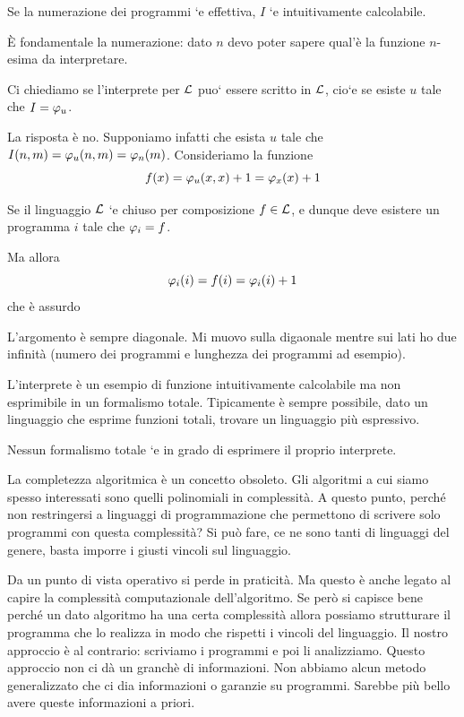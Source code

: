 Se la numerazione dei programmi `e effettiva, $I$ `e intuitivamente calcolabile.

È fondamentale la numerazione: dato $n$ devo poter sapere qual'è la funzione $n$-esima da interpretare.

Ci chiediamo se l'interprete per $\mathcal{L}$ puo` essere scritto in $\mathcal{L}$, cio`e se esiste $u$ tale
che $I = \varphi_{u}$.

La risposta è no. Supponiamo infatti che esista $u$ tale che $I(n, m) = \varphi_{u}(n, m) = \varphi_{n}(m)$.
Consideriamo la funzione
\begin{equation*}
    f(x) = \varphi_{u}(x,x) + 1 = \varphi_{x}(x)+1
\end{equation*}

Se il linguaggio $\mathcal{L}$ `e chiuso per composizione $f \in \mathcal{L}$, e dunque deve esistere un
programma $i$ tale che $\varphi_{i} = f$.

Ma allora
\begin{equation*}
    \varphi_{i}(i) = f(i) = \varphi_{i}(i) + 1
\end{equation*}
che è assurdo

L'argomento è sempre diagonale. Mi muovo sulla digaonale mentre sui lati ho due infinità (numero
dei programmi e lunghezza dei programmi ad esempio).

L'interprete è un esempio di funzione intuitivamente calcolabile ma non esprimibile in un formalismo
totale. Tipicamente è sempre possibile, dato un linguaggio che esprime funzioni totali, trovare un
linguaggio più espressivo.

\begin{thm}
    Nessun formalismo totale `e in grado di esprimere il proprio interprete.
\end{thm}

La completezza algoritmica è un concetto obsoleto. Gli algoritmi a cui siamo spesso interessati sono
quelli polinomiali in complessità. A questo punto, perché non restringersi a linguaggi di
programmazione che permettono di scrivere solo programmi con questa complessità? Si può fare, ce ne
sono tanti di linguaggi del genere, basta imporre i giusti vincoli sul linguaggio.

Da un punto di vista operativo si perde in praticità. Ma questo è anche legato al capire la
complessità computazionale dell'algoritmo. Se però si capisce bene perché un dato algoritmo ha
una certa complessità allora possiamo strutturare il programma che lo realizza in modo che rispetti
i vincoli del linguaggio. Il nostro approccio è al contrario: scriviamo i programmi e poi li
analizziamo. Questo approccio non ci dà un granchè di informazioni. Non abbiamo alcun metodo
generalizzato che ci dia informazioni o garanzie su programmi. Sarebbe più bello avere queste
informazioni a priori.

